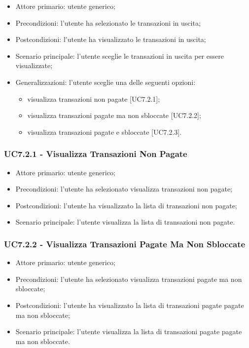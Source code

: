 \begin{itemize}
    \item Attore primario: utente generico;
    \item Precondizioni: l'utente ha selezionato le transazioni in uscita;
    \item Postcondizioni: l'utente ha visualizzato le transazioni in uscita;
    \item Scenario principale: l'utente sceglie le transazioni in uscita per essere visualizzate;
    \item Generalizzazioni: l'utente sceglie una delle seguenti opzioni:
    \begin{itemize}
        \item visualizza transazioni non pagate [UC7.2.1];
        \item visualizza transazioni pagate ma non sbloccate [UC7.2.2];
        \item visualizza transazioni pagate e sbloccate [UC7.2.3].
    \end{itemize}
\end{itemize}

\subsubsection{UC7.2.1 - Visualizza Transazioni Non Pagate}

\begin{itemize}
    \item Attore primario: utente generico;
    \item Precondizioni: l'utente ha selezionato visualizza transazioni non pagate;
    \item Postcondizioni: l'utente ha visualizzato la lista di transazioni non pagate;
    \item Scenario principale: l'utente visualizza la lista di transazioni non pagate.
\end{itemize}

\subsubsection{UC7.2.2 - Visualizza Transazioni Pagate Ma Non Sbloccate}

\begin{itemize}
    \item Attore primario: utente generico;
    \item Precondizioni: l'utente ha selezionato visualizza transazioni pagate ma non sbloccate;
    \item Postcondizioni: l'utente ha visualizzato la lista di transazioni pagate pagate ma non sbloccate;
    \item Scenario principale: l'utente visualizza la lista di transazioni pagate pagate ma non sbloccate.
\end{itemize}

